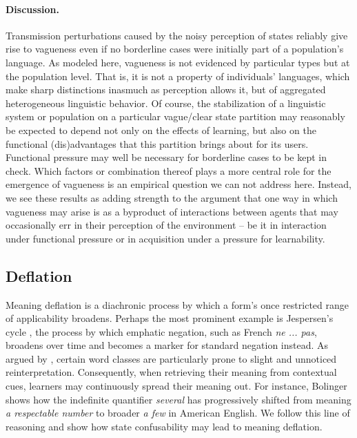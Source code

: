 \documentclass[10pt,a4paper]{article}
\begin{document}
\paragraph{Discussion.}
Transmission perturbations caused by the noisy perception of states reliably give rise to vagueness even if no borderline cases were initially part of a population's language. As modeled here, vagueness is not evidenced by particular types but at the population level. That is, it is not a property of individuals' languages, which make sharp distinctions inasmuch as perception allows it, but of aggregated heterogeneous linguistic behavior. Of course, the stabilization of a linguistic system or population on a particular vague/clear state partition may reasonably be expected to depend not only on the effects of learning, but also on the functional (dis)advantages that this partition brings about for its users. Functional pressure may well be necessary for borderline cases to be kept in check. Which factors or combination thereof plays a more central role for the emergence of vagueness is an empirical question we can not address here. Instead, we see these results as adding strength to the argument that one way in which vagueness may arise is as a byproduct of interactions between agents that may occasionally err in their perception of the environment -- be it in interaction under functional pressure or in acquisition under a pressure for learnability. 

\subsection{Deflation}
Meaning deflation is a diachronic process by which a form's once restricted range of applicability broadens. Perhaps the most prominent example is Jespersen's cycle \citep{dahl:1979}, the process by which emphatic negation, such as French {\em ne ... pas}, broadens over time and becomes a marker for standard negation instead. As argued by \citet{bolinger:1981}, certain word classes are particularly prone to slight and unnoticed reinterpretation. Consequently, when retrieving their meaning from contextual cues, learners may continuously spread their meaning out. For instance, Bolinger shows how the indefinite quantifier {\em several} has progressively shifted from meaning {\em a respectable number} to broader {\em a few} in American English. We follow this line of reasoning and show how state confusability may lead to meaning deflation.
\end{document}
